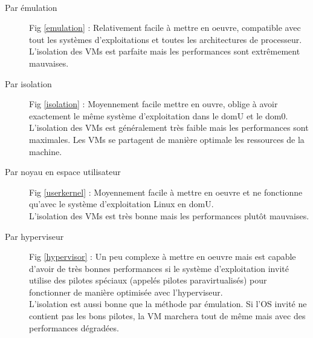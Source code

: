 \paragraph*{}
\begin{description}

	\item[Par émulation] Fig \ref{emulation} : Relativement facile à mettre en oeuvre, compatible avec tout les systèmes d'exploitations et toutes les architectures
	de processeur.\\
	L'isolation des VMs est parfaite mais les performances sont extrêmement mauvaises.

	\item[Par isolation] Fig \ref{isolation} : Moyennement facile mettre en ouvre, oblige à avoir exactement le même système d'exploitation dans le domU et le dom0.\\
	L'isolation des VMs est généralement très faible mais les performances sont maximales. Les VMs se partagent de manière optimale les ressources de la machine.

	\item[Par noyau en espace utilisateur] Fig \ref{userkernel} : Moyennement facile à mettre en oeuvre et ne fonctionne qu'avec le système d'exploitation Linux en domU.\\
	L'isolation des VMs est très bonne mais les performances plutôt mauvaises.

	\item[Par hyperviseur] Fig \ref{hypervisor} : Un peu complexe à mettre en oeuvre mais est capable d'avoir de très bonnes performances si le système d'exploitation invité
	utilise des pilotes spéciaux (appelés pilotes paravirtualisés) pour fonctionner de manière optimisée avec l'hyperviseur.\\
	L'isolation est aussi bonne que la méthode par émulation. Si l'OS invité ne contient pas les bons pilotes, la VM marchera tout de même mais
	avec des performances dégradées.

\end{description}


